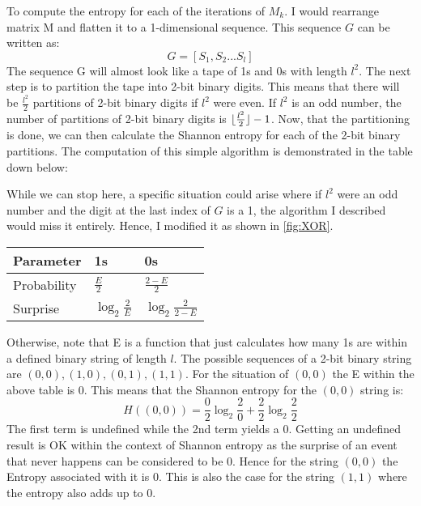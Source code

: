\vspace{0.3cm}
To compute the entropy for each of the iterations of $M_{k}$. I would rearrange matrix M and flatten it to a 1-dimensional sequence. This sequence $G$ can be written as:
$$G=[S_{1}, S_{2}...S_{l}]$$
The sequence G will almost look like a tape of 1s and 0s with length $l^{2}$. The next step is to partition the tape into 2-bit binary digits. This means that there will be $\frac{l^{2}}{2}$ partitions of 2-bit binary digits if $l^{2}$ were even. If $l^{2}$ is an odd number, the number of partitions of 2-bit binary digits is $ \lfloor\frac{l^{2}}{2}\rfloor-1$. Now, that the partitioning is done, we can then calculate the Shannon entropy for each of the 2-bit binary partitions. The computation of this simple algorithm is demonstrated in the table down below: \par
\vspace{0.3cm}
While we can stop here, a specific situation could arise where if $l^{2}$ were an odd number and the digit at the last index of $G$ is a 1, the algorithm I described would miss it entirely. Hence, I modified it as shown in \ref{fig:XOR}.
\begin{center}
\begin{tabular}{ |p{3cm}||p{3cm}||p{3cm}|  }
\hline
Parameter& 1s & 0s \\
 \hline
 Probability  & $\frac{E}{2}$ & $\frac{2-E}{2}$\\  
 Surprise &   $\log_{2}\frac{2}{E}$ & $\log_{2}\frac{2}{2-E}$ \\[1.5ex] 
  \hline
\end{tabular}
\end{center}
Otherwise, note that E is a function that just calculates how many 1s are within a defined binary string of length $l$. The possible sequences of a 2-bit binary string are $(0,0), (1,0), (0,1), (1,1)$. For the situation of $(0,0)$ the E within the above table is 0. This means that the Shannon entropy for the $(0,0)$ string is: 
$$H((0,0))=\frac{0}{2}\log_{2}\frac{2}{0}+\frac{2}{2}\log_{2}\frac{2}{2}$$
The first term is undefined while the 2nd term yields a 0. Getting an undefined result is OK within the context of Shannon entropy as the surprise of an event that never happens can be considered to be 0. Hence for the string $(0,0)$ the Entropy associated with it is 0. This is also the case for the string $(1,1)$ where the entropy also adds up to 0. \par

